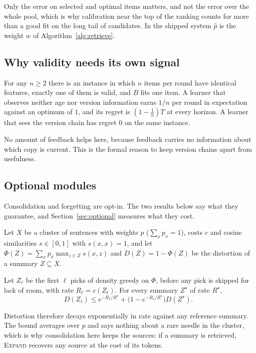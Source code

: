 Only the error on selected and optimal items matters, and not the error over the whole pool, which is why calibration near the top of the ranking counts for more than a good fit on the long tail of candidates. In the shipped system $\hat p$ is the weight $w$ of Algorithm~\ref{alg:retrieve}.

\subsection{Why validity needs its own signal}
\begin{proposition}\label{prop:blind}
For any $n\ge2$ there is an instance in which $n$ items per round have identical features, exactly one of them is valid, and $B$ fits one item. A learner that observes neither age nor version information earns $1/n$ per round in expectation against an optimum of $1$, and its regret is $(1-\frac1n)T$ at every horizon. A learner that sees the version chain has regret $0$ on the same instance.
\end{proposition}

No amount of feedback helps here, because feedback carries no information about which copy is current. This is the formal reason to keep version chains apart from usefulness.

\subsection{Optional modules}
Consolidation and forgetting are opt-in. The two results below say what they guarantee, and Section~\ref{sec:optional} measures what they cost.

Let $X$ be a cluster of sentences with weights $p$ ($\sum_x p_x=1$), costs $c$ and cosine similarities $s\in[0,1]$ with $s(x,x)=1$, and let $\Phi(Z)=\sum_xp_x\max_{z\in Z}s(x,z)$ and $D(Z)=1-\Phi(Z)$ be the distortion of a summary $Z\subseteq X$.

\begin{theorem}\label{thm:rd}
Let $Z_\ell$ be the first $\ell$ picks of density greedy on $\Phi$, before any pick is skipped for lack of room, with rate $R_\ell=c(Z_\ell)$. For every summary $Z^\star$ of rate $R^\star$,
\[D(Z_\ell)\le e^{-R_\ell/R^\star}+\big(1-e^{-R_\ell/R^\star}\big)D(Z^\star).\]
\end{theorem}

Distortion therefore decays exponentially in rate against any reference summary. The bound averages over $p$ and says nothing about a rare needle in the cluster, which is why consolidation here keeps the sources: if a summary is retrieved, \textsc{Expand} recovers any source at the cost of its tokens.

